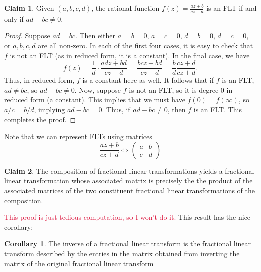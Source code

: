 \documentclass[aps,pra,showpacs,notitlepage,onecolumn,superscriptaddress,nofootinbib]{revtex4-1}
\newcommand{\pop}[1]{\textcolor{crimson}{#1}}
\theoremstyle{definition}
\newtheorem{corollary}{Corollary}[theorem]
\newtheorem{claim}{Claim}[section]
\newcommand{\hhrulefill}{\hspace{-1.5em} \hrulefill}
\begin{document}
\begin{claim}
  Given $(a, b, c, d)$, the rational function $f(z) = \frac{az + b}{cz + d}$ is an FLT if and only if $ad - bc \neq 0$.
\end{claim}
\begin{proof}
  Suppose $ad = bc$. Then either $a = b = 0$, $a = c = 0$, $d = b = 0$, $d = c = 0$, or $a, b, c, d$ are all non-zero. In each of the first four cases, it is easy to check that $f$ is not an FLT (as in reduced form, it is a constant).
  In the final case, we have
  \begin{equation}
   f(z) = \frac{1}{d} \cdot \frac{adz + bd}{cz + d} = \frac{bcz + bd}{cz + d} = \frac{b}{d} \frac{cz + d}{cz + d}.
  \end{equation}
  Thus, in reduced form, $f$ is a constant here as well. It follows that if $f$ is an FLT, $ad \neq bc$, so $ad - bc \neq 0$. Now, suppose $f$ is not an FLT, so it is degree-$0$ in reduced form (a constant). This implies
  that we must have $f(0) = f(\infty)$, so $a/c = b/d$, implying $ad - bc = 0$. Thus, if $ad - bc \neq 0$, then $f$ is an FLT. This completes the proof.
\end{proof}

\noindent Note that we can represent FLTs using matrices
\begin{equation}
 \frac{az + b}{cz + d} \Longleftrightarrow \begin{pmatrix} a & b\\ c & d \end{pmatrix}
  \end{equation}

\begin{claim}
  The composition of fractional linear transformations yields a fractional linear transformation whose associated matrix is precisely the the product of the associated matrices of the two
  constituent fractional linear transformations of the composition.
\end{claim}

\noindent \pop{This proof is just tedious computation, so I won't do it.} This result has the nice corollary:

\begin{corollary}
  The inverse of a fractional linear transform is the fractional linear transform described by the entries in the matrix obtained from inverting the matrix of the original fractional linear transform
  \end{corollary}

\hhrulefill
\end{document}

